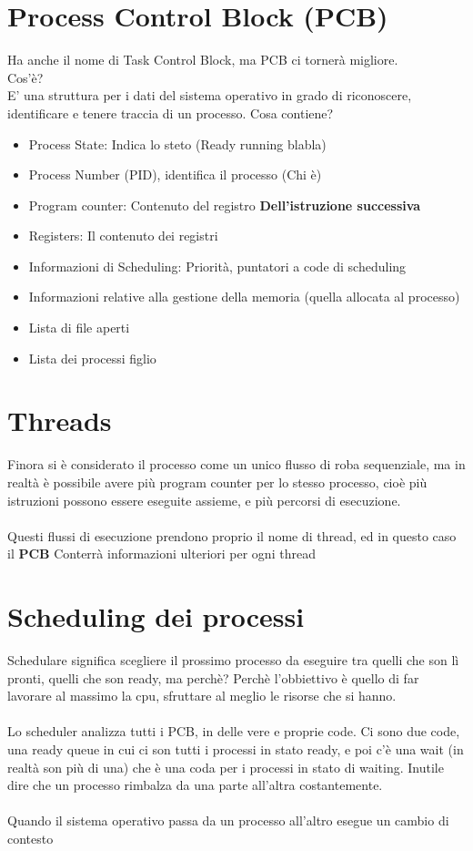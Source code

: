 \documentclass[12pt, a4paper, openany, twoside]{book}
\begin{document}
\section{Process Control Block (PCB)}
Ha anche il nome di Task Control Block, ma PCB ci tornerà migliore. \\
Cos'è? \\
E' una struttura per i dati del sistema operativo in grado di riconoscere, 
identificare e tenere traccia di un processo.
Cosa contiene?\\ 
\begin{itemize}
	\item Process State: Indica lo steto (Ready running blabla)
	\item Process Number (PID), identifica il processo (Chi è)
	\item Program counter: Contenuto del registro \color{red} \textbf{Dell'istruzione
	successiva} \color{black}
	\item Registers: Il contenuto dei registri
	\item Informazioni di Scheduling: Priorità, puntatori a code di scheduling
	\item Informazioni relative alla gestione della memoria (quella allocata al processo)
	\item Lista di file aperti
	\item Lista dei processi figlio
\end{itemize}
\section{Threads}
Finora si è considerato il processo come un unico flusso di roba sequenziale,
ma in realtà è possibile avere più program counter per lo stesso processo, cioè
più istruzioni possono essere eseguite assieme, e più percorsi di esecuzione.
\\ \\
Questi flussi di esecuzione prendono proprio il nome di thread, ed in questo caso
il \textbf{PCB} Conterrà informazioni ulteriori per ogni thread  
\section{Scheduling dei processi}
Schedulare significa scegliere il prossimo processo da eseguire tra quelli che 
son lì pronti, quelli che son ready, ma perchè? Perchè l'obbiettivo è quello di 
far lavorare al massimo la cpu, sfruttare al meglio le risorse che si hanno. \\
\\ 
Lo scheduler analizza tutti i PCB, in delle vere e proprie code. Ci sono due code,
una ready queue in cui ci son tutti i processi in stato ready, e poi c'è una 
wait (in realtà son più di una) che è una coda per i processi in stato di waiting.
Inutile dire che un processo rimbalza da una parte all'altra costantemente.
\\ \\
Quando il sistema operativo passa da un processo all'altro esegue un cambio
di contesto 
\end{document}

